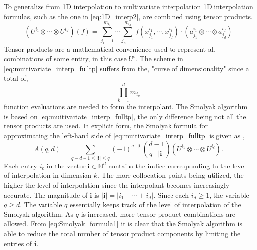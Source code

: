 To generalize from 1D interpolation to multivariate interpolation 1D interpolation formulas, such as the one in \ref{eq:1D_interp2}, are combined using tensor products.
\begin{equation} \label{eq:muitivariate_interp_fulltp}
    \left(U^{i_1} \otimes\cdots\otimes U^{i_d}\right)\left(f\right) = 
     \sum_{j_1=1}^{m_{i_1}} \cdots
      \sum_{j_d=1}^{m_{i_d}} f\left(
       x_{j_1}^{i_1},\cdots,x_{j_d}^{i_d}\right)\cdot
        \left(a_{j_1}^{i_1}\otimes\cdots\otimes a_{j_d}^{i_d}\right)
\end{equation}   
Tensor products are a mathematical convenience used to represent all combinations of some entity, in this case $U^i$. The scheme in \ref{eq:muitivariate_interp_fulltp} suffers from the, "curse of dimensionality" since a total of,
\begin{equation}
    \prod_{k=1}^d m_{i_k}
\end{equation}     
function evaluations are needed to form the interpolant. The Smolyak algorithm is based on \ref{eq:muitivariate_interp_fulltp}, the only difference being not all the tensor products are used. In explicit form, the Smolyak formula for approximating the left-hand side of \ref{eq:muitivariate_interp_fulltp} is given as \cite{NovakRitter},
\begin{equation} \label{eq:Smolyak_formula1}
    A\left(q,d\right) = 
     \sum_{q-d+1\leq \vert \textbf{i}\vert\leq q}
      \left(-1\right)^{q-\vert\textbf{i}\vert}
       \binom{d-1}{q-\vert\textbf{i}\vert}
        \left(U^{i_1} \otimes\cdots\otimes U^{i_d}\right).
\end{equation}
Each entry $i_k$ in the vector $\textbf{i} \in \mathbb{N}^d$ contains the indice corresponding to the level of interpolation in dimension $k$. The more collocation points being utilized, the higher the level of interpolation since the interpolant becomes increasingly accurate. The magnitude of $\textbf{i}$ is $\vert\textbf{i}\vert = \vert i_1 +\cdots+ i_d\vert$. Since each $i_d \geq 1$, the variable $q \geq d$. The variable $q$ essentially keeps track of the level of interpolation of the Smolyak algorithm. As $q$ is increased, more tensor product combinations are allowed. From \ref{eq:Smolyak_formula1} it is clear that the Smolyak algorithm is able to reduce the total number of tensor product components by limiting the entries of $\textbf{i}$.

